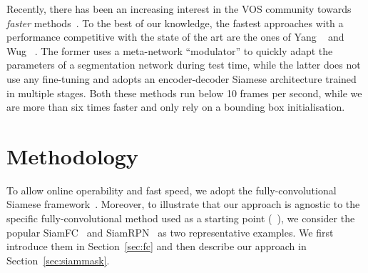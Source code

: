 \documentclass[10pt,twocolumn,letterpaper]{article}
\begin{document}
Recently, there has been an increasing interest in the VOS community towards \emph{faster} methods~\cite{marki2016bilateral,wug2018fast,cheng2018fast,chen2018blazingly,jampani2017video,hu2018videomatch}.
To the best of our knowledge, the fastest approaches with a performance competitive with the state of the art are the ones of Yang \etal~\cite{Yang_2018_CVPR} and Wug \etal~\cite{wug2018fast}.
The former uses a meta-network ``modulator'' to quickly adapt the parameters of a segmentation network during test time, while the latter does not use any fine-tuning and adopts an encoder-decoder Siamese architecture trained in multiple stages.
Both these methods run below 10 frames per second, while we are more than six times faster and only rely on a bounding box initialisation.
 
\section{Methodology}
\label{sec:method}
To allow online operability and fast speed, we adopt the fully-convolutional Siamese framework~\cite{bertinetto2016fully}.
Moreover, to illustrate that our approach is agnostic to the specific fully-convolutional method used as a starting point (\eg~\cite{bertinetto2016fully,SiamRPN,zhu2018distractor,yang2018learning,he2018twofold}), we consider the popular SiamFC~\cite{bertinetto2016fully} and SiamRPN~\cite{SiamRPN} as two representative examples.
We first introduce them in Section~\ref{sec:fc} and then describe our approach in Section~\ref{sec:siammask}.
\end{document}
